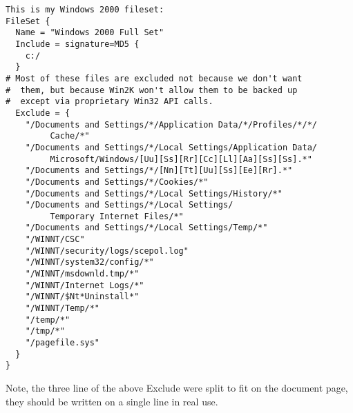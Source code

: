 \footnotesize
\begin{verbatim}
This is my Windows 2000 fileset:
FileSet {
  Name = "Windows 2000 Full Set"
  Include = signature=MD5 {
    c:/
  }
# Most of these files are excluded not because we don't want
#  them, but because Win2K won't allow them to be backed up
#  except via proprietary Win32 API calls.
  Exclude = {
    "/Documents and Settings/*/Application Data/*/Profiles/*/*/
         Cache/*"
    "/Documents and Settings/*/Local Settings/Application Data/
         Microsoft/Windows/[Uu][Ss][Rr][Cc][Ll][Aa][Ss][Ss].*"
    "/Documents and Settings/*/[Nn][Tt][Uu][Ss][Ee][Rr].*"
    "/Documents and Settings/*/Cookies/*"
    "/Documents and Settings/*/Local Settings/History/*"
    "/Documents and Settings/*/Local Settings/
         Temporary Internet Files/*"
    "/Documents and Settings/*/Local Settings/Temp/*"
    "/WINNT/CSC"
    "/WINNT/security/logs/scepol.log"
    "/WINNT/system32/config/*"
    "/WINNT/msdownld.tmp/*"
    "/WINNT/Internet Logs/*"
    "/WINNT/$Nt*Uninstall*"
    "/WINNT/Temp/*"
    "/temp/*"
    "/tmp/*"
    "/pagefile.sys"
  }
}
\end{verbatim}
\normalsize

Note, the three line of the above Exclude were split to fit on the document
page, they should be written on a single line in real use. 
